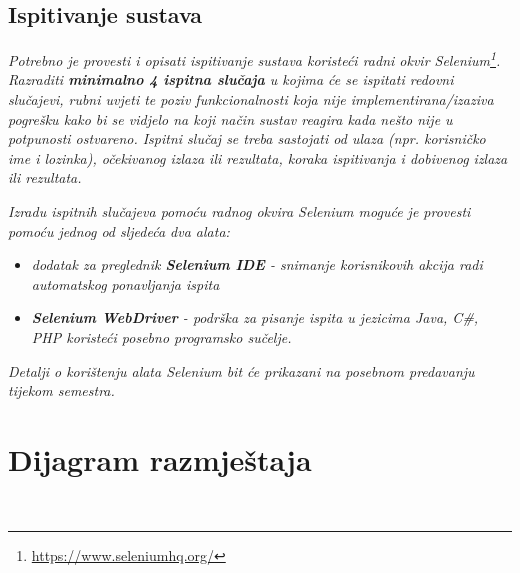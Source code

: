			
			
			\subsection{Ispitivanje sustava}
			
			 \textit{Potrebno je provesti i opisati ispitivanje sustava koristeći radni okvir Selenium\footnote{\url{https://www.seleniumhq.org/}}. Razraditi \textbf{minimalno 4 ispitna slučaja} u kojima će se ispitati redovni slučajevi, rubni uvjeti te poziv funkcionalnosti koja nije implementirana/izaziva pogrešku kako bi se vidjelo na koji način sustav reagira kada nešto nije u potpunosti ostvareno. Ispitni slučaj se treba sastojati od ulaza (npr. korisničko ime i lozinka), očekivanog izlaza ili rezultata, koraka ispitivanja i dobivenog izlaza ili rezultata.\\ }
			 
			 \textit{Izradu ispitnih slučajeva pomoću radnog okvira Selenium moguće je provesti pomoću jednog od sljedeća dva alata:}
			 \begin{itemize}
			 	\item \textit{dodatak za preglednik \textbf{Selenium IDE} - snimanje korisnikovih akcija radi automatskog ponavljanja ispita	}
			 	\item \textit{\textbf{Selenium WebDriver} - podrška za pisanje ispita u jezicima Java, C\#, PHP koristeći posebno programsko sučelje.}
			 \end{itemize}
		 	\textit{Detalji o korištenju alata Selenium bit će prikazani na posebnom predavanju tijekom semestra.}
			
			\eject 
		
		
		\section{Dijagram razmještaja}
		
		\\
			
